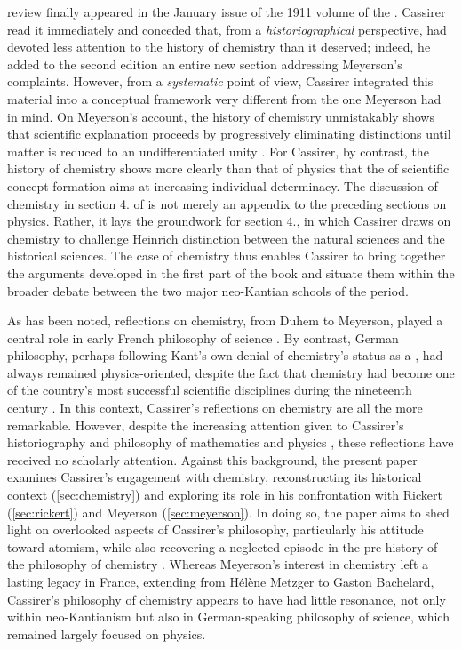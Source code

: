 \documentclass[submitted,12pt]{article}
\begin{document}
 review finally appeared in the January issue of the 1911 volume of the . Cassirer read it immediately and conceded that, from a \emph{historiographical} perspective, \EPt had devoted less attention to the history of chemistry than it deserved; indeed, he added to the second edition an entire new section addressing Meyerson's complaints. However, from a \emph{systematic} point of view, Cassirer integrated this material into a conceptual framework very different from the one Meyerson had in mind. On Meyerson’s account, the history of chemistry unmistakably shows that scientific explanation proceeds by progressively eliminating distinctions until matter is reduced to an undifferentiated unity \citep[ch. ]{Meyerson1908}. For Cassirer, by contrast, the history of chemistry shows more clearly than that of physics that the  of scientific concept formation aims at increasing individual determinacy. The discussion of chemistry in section 4. of \SFt is not merely an appendix to the preceding sections on physics. Rather, it lays the groundwork for section 4., in which Cassirer draws on chemistry to challenge Heinrich  distinction between the  natural sciences and the  historical sciences. The case of chemistry thus enables Cassirer to bring together the arguments developed in the first part of the book and situate them within the broader debate between the two major neo-Kantian schools of the period.

As has been noted, reflections on chemistry, from Duhem to Meyerson, played a central role in early French philosophy of science \citep{Bensaude-Vincent2009a}. By contrast, German philosophy, perhaps following Kant's own denial of chemistry's status as a , had always remained physics-oriented, despite the fact that chemistry had become one of the country's most successful scientific disciplines during the nineteenth century . In this context, Cassirer's reflections on chemistry are all the more remarkable. However, despite the increasing attention given to Cassirer's historiography and philosophy of mathematics \citep{Reck2020} and physics \citep{Ryckman2005}, these reflections have received no scholarly attention. Against this background, the present paper examines Cassirer's engagement with chemistry, reconstructing its historical context (\cref{sec:chemistry}) and exploring its role in his confrontation with Rickert (\cref{sec:rickert}) and Meyerson (\cref{sec:meyerson}). In doing so, the paper aims to shed light on overlooked aspects of Cassirer’s philosophy, particularly his attitude toward atomism, while also recovering a neglected episode in the pre-history of the philosophy of chemistry \citep{VanBrakel2012}. Whereas Meyerson's interest in chemistry left a lasting legacy in France, extending from H{\'e}l{\`e}ne Metzger to Gaston Bachelard, Cassirer's philosophy of chemistry appears to have had little resonance, not only within neo-Kantianism but also in German-speaking philosophy of science, which remained largely focused on physics.
\end{document}
